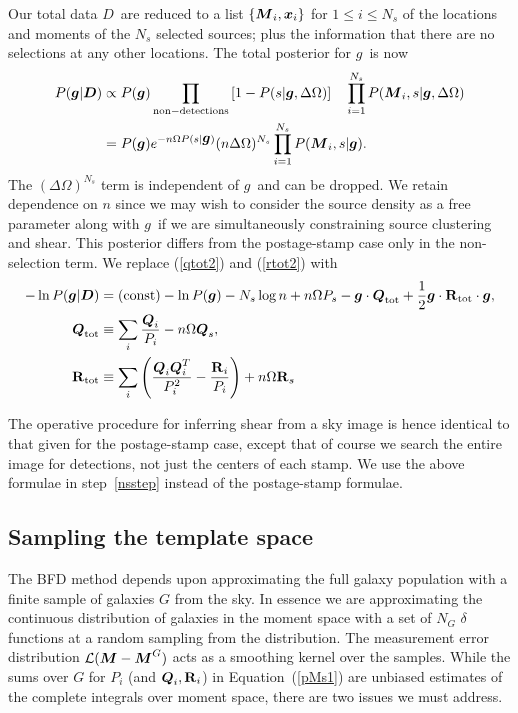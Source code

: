 \documentclass[11pt,preprint,flushrt]{aastex}
\def\eqq#1{Equation~(\ref{#1})}
\newcommand{\vecD}{\mbox{\boldmath $D$}}
\newcommand{\vecg}{\mbox{\boldmath $g$}}
\newcommand{\vecM}{\mbox{\boldmath $M$}}
\newcommand{\vecQ}{\mbox{\boldmath $Q$}}
\newcommand{\vecx}{\mbox{\boldmath $x$}}
\newcommand{\matR}{\mbox{$\bf R$}}
\newcommand{\likeli}{\mbox{$\mathcal{L}$}}
\begin{document}
Our total
data \vecD\ are reduced to a list $\{\vecM_i, \vecx_i\}$ for $1\le i
\le N_s$ of the locations and moments of the $N_s$ selected sources;
plus the information that there are no selections at any other
locations.  The total posterior for \vecg\ is now
\begin{align}
P(\vecg | \vecD) & \propto P(\vecg) 
\prod_{\rm non-detections} \left[1-P(s | \vecg, \Delta\Omega)\right] \quad
                   \prod_{i=1}^{N_s} P(\vecM_i, s | \vecg, \Delta\Omega)\\
\label{poissonposterior}
 & = P(\vecg)  e^{-n\Omega P(s|\vecg)} (n\Delta\Omega)^{N_s} \prod_{i=1}^{N_s} P(\vecM_i,
   s|\vecg).
\end{align}
The $(\Delta\Omega)^{N_s}$ term is independent of \vecg\ and can be
dropped.  We retain dependence on $n$ since we may wish to consider
the source density as a free parameter along with \vecg\ if we are
simultaneously constraining source clustering and shear.
This posterior differs from the postage-stamp case only in
the non-selection term.  We replace (\ref{qtot2}) and (\ref{rtot2}) with
\begin{align}
\label{pqrpoisson}
-\ln P(\vecg | \vecD) & = ({\rm const}) - \ln P(\vecg) - N_s\log n +
                        n\Omega P_s - \vecg \cdot \vecQ_{\rm tot}
+ \frac{1}{2} \vecg \cdot \matR_{\rm tot}
   \cdot \vecg, \\
\label{qtotpoisson}
\vecQ_{\rm tot} & \equiv \sum_i   \frac{\vecQ_i}{P_i}  - n\Omega
                  \vecQ_s, \\
\label{rtotpoisson}
\matR_{\rm tot} & \equiv \sum_i \left(
   \frac{\vecQ_i\vecQ_i^T}{P_i^2} - \frac{\matR_i}{P_i}\right) +
                  n\Omega \matR_s
\end{align}
 
The operative procedure for inferring shear from a sky image is hence
identical to that given for the postage-stamp case, except that of
course we search the entire image for detections, not just the centers
of each stamp.  We use the above formulae in step~\ref{nsstep} instead
of the postage-stamp formulae.

\subsection{Sampling the template space}
\label{templates}
The BFD method depends upon approximating the full galaxy population
with a finite sample of galaxies $G$ from the sky.  In essence we are
approximating the continuous distribution of galaxies in the moment
space with a set of $N_G$ $\delta$ functions at a random sampling from
the distribution.  The measurement error distribution
$\likeli(\vecM-\vecM^G)$ acts as a smoothing kernel over the samples.
 While the sums over $G$ for $P_i$ (and $\vecQ_i, \matR_i$) in \eqq{pMs1}
are unbiased estimates of the complete integrals over moment space,
there are two issues we must address.  
\end{document}
